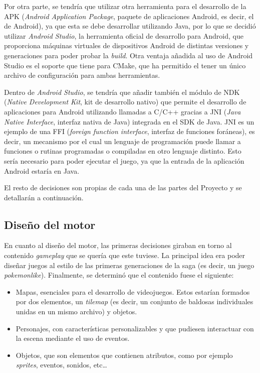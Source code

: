 \medskip

Por otra parte, se tendría que utilizar otra herramienta para el desarrollo de la APK (\textit{Android Application Package}, paquete de aplicaciones Android, es decir, el  de Android), ya que esta se debe desarrollar utilizando Java, por lo que se decidió utilizar \textit{Android Studio}, la herramienta oficial de desarrollo para Android, que proporciona máquinas virtuales de dispositivos Android de distintas versiones y generaciones para poder probar la \textit{build}. Otra ventaja añadida al uso de Android Studio es el soporte que tiene para CMake, que ha permitido el tener un único archivo de configuración para ambas herramientas.

\smallskip

Dentro de \textit{Android Studio}, se tendría que añadir también el módulo de NDK (\textit{Native Development Kit}, kit de desarrollo nativo) que permite el desarrollo de aplicaciones para Android utilizando llamadas a C/C++ gracias a JNI (\textit{Java Native Interface}, interfaz nativa de Java) integrada en el SDK de Java. JNI es un ejemplo de una FFI (\textit{foreign function interface}, interfaz de funciones foráneas), es decir, un mecanismo por el cual un lenguaje de programación puede llamar a funciones o rutinas programadas o compiladas en otro lenguaje distinto. Esto sería necesario para poder ejecutar el juego, ya que la entrada de la aplicación Android estaría en Java.

\medskip

El resto de decisiones son propias de cada una de las partes del Proyecto y se detallarán a continuación.

\subsection{Diseño del motor}
En cuanto al diseño del motor, las primeras decisiones giraban en torno al contenido \textit{gameplay} que se quería que este tuviese. La principal idea era poder diseñar juegos al estilo de las primeras generaciones de la saga \cite{pokemon} (es decir, un juego \textit{pokemonlike}). Finalmente, se determinó que el contenido fuese el siguiente:
\begin{itemize}
	\item Mapas, esenciales para el desarrollo de videojuegos. Estos estarían formados por dos elementos, un \textit{tilemap} (es decir, un conjunto de baldosas individuales unidas en un mismo archivo) y objetos.
	\item Personajes, con características personalizables y que pudiesen interactuar con la escena mediante el uso de eventos.
	\item Objetos, que son elementos que contienen atributos, como por ejemplo \textit{sprites}, eventos, sonidos, etc\ldots
\end{itemize}

